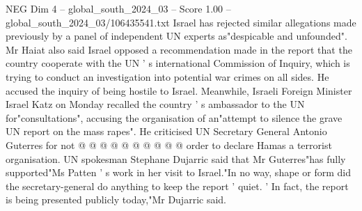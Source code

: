 \begin{textsample}{NEG Dim 4 – global\_south\_2024\_03 – Score 1.00 – global\_south\_2024\_03/106435541.txt}
Israel has rejected similar allegations made previously by a panel of independent UN experts as"despicable and unfounded".
Mr Haiat also said Israel opposed a recommendation made in the report that the country cooperate with the UN ' s international Commission of Inquiry, which is trying to conduct an investigation into potential war crimes on all sides.
He accused the inquiry of being hostile to Israel.
Meanwhile, Israeli Foreign Minister Israel Katz on Monday recalled the country ' s ambassador to the UN for"consultations", accusing the organisation of an"attempt to silence the grave UN report on the mass rapes".
He criticised UN Secretary General Antonio Guterres for not @ @ @ @ @ @ @ @ @ @ order to declare Hamas a terrorist organisation.
UN spokesman Stephane Dujarric said that Mr Guterres"has fully supported"Ms Patten ' s work in her visit to Israel."In no way, shape or form did the secretary-general do anything to keep the report ' quiet. ' In fact, the report is being presented publicly today,"Mr Dujarric said.

\end{textsample}

